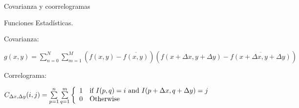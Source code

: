 \documentclass{beamer}
\begin{document}
\begin{frame}{Covarianza y coorrelogramas}

\begin{block}{}
	Funciones Estadísticas.
\end{block}

Covarianza: \\

\begin{tiny}
\centering
\begin{math} 
	g(x,y) = \sum \limits_{n=0}^{N} \sum \limits_{m=1}^M \left( f(x,y) - \overline{f(x,y)}\right)\left(f(x + \Delta x, y + \Delta y) - \overline{f(x + \Delta x, y + \Delta y)} \right)
\end{math}
\end{tiny}



Correlograma: \\

\begin{small}

\begin{math}
 C_{\Delta x,\Delta y}(i,j) = \sum \limits_{p=1}^{n} \sum \limits_{q=1}^{m} 
 \left\{
	\begin{array}{l l}
		1  & \mbox{if } I(p,q)=i \mbox{  and } I(p+\Delta x,q + \Delta y)= j \\
		0 & \mbox{Otherwise}
      \end{array}\right. 
\end{math}

\end{small}

\end{frame}
\end{document}
